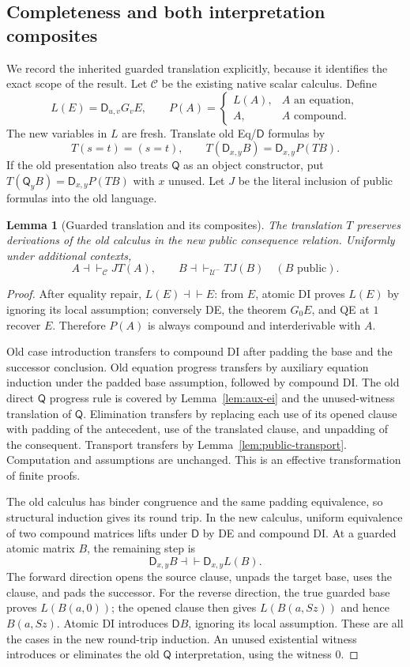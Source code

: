\documentclass[11pt,letterpaper]{article}
\newtheorem{lemma}[theorem]{Lemma}
\theoremstyle{definition}\newtheorem{definition}[theorem]{Definition}
\theoremstyle{remark}\newtheorem{remark}[theorem]{Remark}
\newcommand{\D}{\mathsf D}
\newcommand{\Q}{\mathsf Q}
\newcommand{\U}{\mathcal U^{-}}
\begin{document}
\subsection{Completeness and both interpretation composites}

We record the inherited guarded translation explicitly, because it
identifies the exact scope of the result.  Let $\mathcal C$ be the
existing native scalar calculus.  Define
\[
 L(E)=\D_{u,v}G_vE,\qquad
 P(A)=\begin{cases}L(A),&A\text{ an equation},\\A,&A\text{ compound}.
 \end{cases}
\]
The new variables in $L$ are fresh.  Translate old Eq/$\D$ formulas by
\[
 T(s=t)=(s=t),\qquad
 T(\D_{x,y}B)=\D_{x,y}P(TB).
\]
If the old presentation also treats $\Q$ as an object constructor, put
$T(\Q_yB)=\D_{x,y}P(TB)$ with $x$ unused.  Let $J$ be the literal
inclusion of public formulas into the old language.

\begin{lemma}[Guarded translation and its composites]\label{lem:guarded-composites}
The translation $T$ preserves derivations of the old calculus in the new
public consequence relation.  Uniformly under additional contexts,
\[
 A\dashv\vdash_{\mathcal C}JT(A),\qquad
 B\dashv\vdash_{\U}TJ(B)\quad(B\text{ public}).
\]
\end{lemma}
\begin{proof}
After equality repair, $L(E)\dashv\vdash E$: from $E$, atomic DI
proves $L(E)$ by ignoring its local assumption; conversely DE, the
theorem $G_0E$, and QE at $1$ recover $E$.  Therefore $P(A)$ is
always compound and interderivable with $A$.

Old case introduction transfers to compound DI after padding the base
and the successor conclusion.  Old equation progress transfers by
auxiliary equation induction under the padded base assumption, followed
by compound DI.  The old direct $\Q$ progress rule is covered by
Lemma~\ref{lem:aux-ei} and the unused-witness translation of $\Q$.
Elimination transfers by replacing each use of its opened clause with
padding of the antecedent, use of the translated clause, and unpadding
of the consequent.  Transport transfers by
Lemma~\ref{lem:public-transport}.  Computation and assumptions are
unchanged.  This is an effective transformation of finite proofs.

The old calculus has binder congruence and the same padding equivalence,
so structural induction gives its round trip.  In the new calculus,
uniform equivalence of two compound matrices lifts under $\D$ by DE
and compound DI.  At a guarded atomic matrix $B$, the remaining step is
\[
 \D_{x,y}B\dashv\vdash\D_{x,y}L(B).
\]
The forward direction opens the source clause, unpads the target base,
uses the clause, and pads the successor.  For the reverse direction,
the true guarded base proves $L(B(a,0))$; the opened clause then gives
$L(B(a,Sz))$ and hence $B(a,Sz)$.  Atomic DI introduces $\D B$,
ignoring its local assumption.  These are all the cases in the new
round-trip induction.  An unused existential witness introduces or
eliminates the old $\Q$ interpretation, using the witness $0$.
\end{proof}
\end{document}
